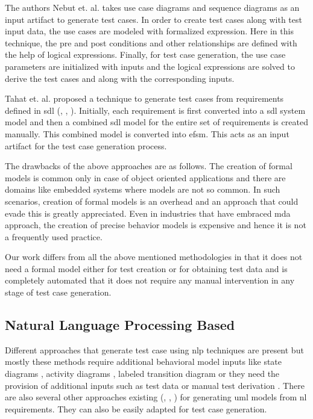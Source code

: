 The authors Nebut et. al. \cite{nebut2003requirements} takes use case diagrams and sequence diagrams as an input artifact to generate test cases. In order to create test cases along with test input data, the use cases are modeled with formalized expression. Here in this technique, the pre and post conditions and other relationships are defined with the help of logical expressions. Finally, for test case generation, the use case parameters are initialized with inputs and the logical expressions are solved to derive the test cases and along with the corresponding inputs.

Tahat et. al. \cite{tahat2001requirement} proposed a technique to generate test cases from requirements defined in \gls{sdl} (\cite{algayres2012goal}, \cite{bochmann1997automating}, \cite{bromstrup1995tesdl}). Initially, each requirement is first converted into a \gls{sdl} system model and then a combined \gls{sdl} model for the entire set of requirements is created manually. This combined model is converted into \gls{efsm}. This acts as an input artifact for the test case generation process.

The drawbacks of the above approaches are as follows. The creation of formal models is common only in case of object oriented applications and there are domains like embedded systems where models are not so common. In such scenarios, creation of formal models is an overhead and an approach that could evade this is greatly appreciated. Even in industries that have embraced \gls{mda} approach, the creation of precise behavior models is expensive and hence it is not a frequently used practice.

Our work differs from all the above mentioned methodologies in that it does not need a formal model either for test creation or for obtaining test data and is completely automated that it does not require any manual intervention in any stage of test case generation.

\subsection{Natural Language Processing Based}
Different approaches that generate test case using \gls{nlp} techniques are present but mostly these methods require additional behavioral model inputs like state diagrams \cite{ryser1999scenario}, activity diagrams \cite{hasling2008model}, labeled transition diagram \cite{katara2006making} or they need the provision of additional inputs such as test data or manual test derivation \cite{bertolino2003use}. There are also several other approaches existing (\cite{frohlich2000automated}, \cite{yue2010automated}, \cite{yue2013facilitating}) for generating \gls{uml} models from \gls{nl} requirements. They can also be easily adapted for test case generation.


